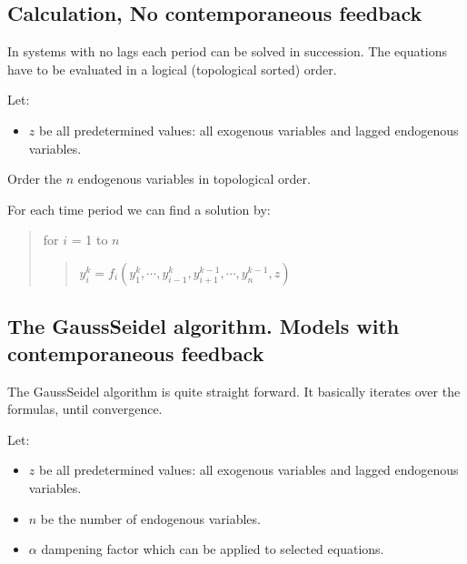 \documentclass[letterpaper,10pt,english]{jupyterBook}
\begin{document}
\subsection{Calculation, No contemporaneous feedback}
\label{\detokenize{content/notebooks/intro/model and solution:calculation-no-contemporaneous-feedback}}
\sphinxAtStartPar
In systems with no lags each period can be solved in succession.
The equations have to be evaluated in a logical (topological sorted) order.

\sphinxAtStartPar
Let:
\begin{itemize}
\item {} 
\sphinxAtStartPar
\(z\) be all predetermined values: all exogenous variables and lagged endogenous variables.

\end{itemize}

\sphinxAtStartPar
Order the \(n\) endogenous variables in topological order.

\sphinxAtStartPar
For each time period we can find a solution by:
\begin{quote}

\sphinxAtStartPar
for \(i\) = 1 to \(n\)
\begin{quote}

\sphinxAtStartPar
\(y_{i}^{k} = f_i(y_1^{k},\cdots,y_{i-1}^{k},y_{i+1}^{k-1},\cdots,y_{n}^{k-1},z)\)
\end{quote}
\end{quote}


\subsection{The Gauss\sphinxhyphen{}Seidel algorithm. Models with contemporaneous feedback}
\label{\detokenize{content/notebooks/intro/model and solution:the-gauss-seidel-algorithm-models-with-contemporaneous-feedback}}
\sphinxAtStartPar
The Gauss\sphinxhyphen{}Seidel algorithm is quite straight forward. It basically iterates over the formulas, until convergence.

\sphinxAtStartPar
Let:
\begin{itemize}
\item {} 
\sphinxAtStartPar
\(z\) be all predetermined values: all exogenous variables and lagged endogenous variables.

\item {} 
\sphinxAtStartPar
\(n\) be the number of endogenous variables.

\item {} 
\sphinxAtStartPar
\(\alpha\) dampening factor which can be applied to selected equations.

\end{itemize}
\end{document}
